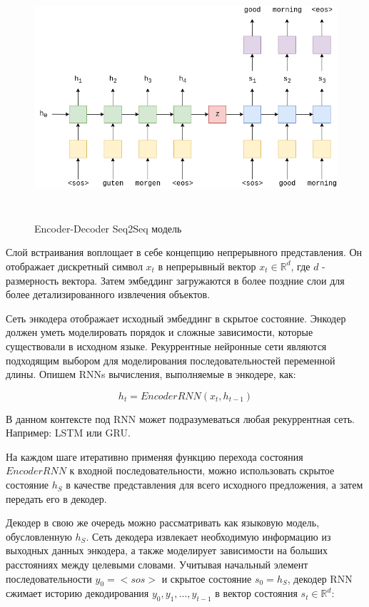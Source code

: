     \begin{figure}[ht!]
		\centering
		\captionsetup{justification=centering}
		\includegraphics[height=90mm]{img/encoder-decoder-img-1.png}
		\caption{Encoder-Decoder Seq2Seq модель}
	\end{figure}
	
	Слой встраивания воплощает в себе концепцию непрерывного представления. Он отображает дискретный символ $x_t$ в непрерывный вектор $x_t \in \mathbb{R}^d$, где $d$ - размерность вектора. Затем эмбеддинг загружаются в более поздние слои для более детализированного извлечения объектов.
	
	Сеть энкодера отображает исходный эмбеддинг в скрытое состояние. Энкодер должен уметь моделировать порядок и сложные зависимости, которые существовали в исходном языке. Рекуррентные нейронные сети являются подходящим выбором для моделирования последовательностей переменной длины. Опишем RNNs вычисления, выполняемые в энкодере, как:
	
	$$
	    h_t = EncoderRNN(x_t, h_{t-1})
	$$
	
	В данном контексте под RNN может подразумеваться любая рекуррентная сеть. Например: LSTM или GRU.

	На каждом шаге итеративно применяя функцию перехода состояния $EncoderRNN$ к входной последовательности, можно использовать скрытое состояние $h_S$ в качестве представления для всего исходного предложения, а затем передать его в декодер.
	
	Декодер в свою же очередь можно рассматривать как языковую модель, обусловленную $h_S$. Сеть декодера извлекает необходимую информацию из выходных данных энкодера, а также моделирует зависимости на больших расстояниях между целевыми словами. Учитывая начальный элемент последовательности $y_0 = <sos>$ и скрытое состояние $s_0=h_S$, декодер RNN сжимает историю декодирования ${y_0, y_1, ... ,y_{t−1}}$ в вектор состояния $s_t \in \mathbb{R}^d$:
	
